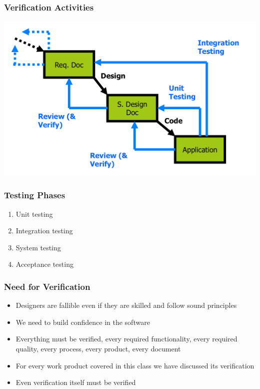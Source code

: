 \documentclass[t,12pt,numbers,fleqn]{beamer}
\begin{document}
\begin{frame}
\frametitle{Verification Activities}

\begin{center}
\includegraphics[scale=0.55]{../Figures/SoftwareLifecycle.png}
\end{center}

\end{frame}


\begin{frame}
\frametitle{Testing Phases}
\begin{enumerate}
\item Unit testing
\item Integration testing
\item System testing
\item Acceptance testing
\end{enumerate}
\end{frame}


\begin{frame}
\frametitle{Need for Verification}

\begin{itemize}

\item Designers are fallible even if they are skilled and follow sound principles
\item We need to build confidence in the software
\item Everything must be verified, every required functionality, every required
  quality, every process, every product, every document
\item For every work product covered in this class we have discussed its verification
\item Even verification itself must be verified

\end{itemize}

\end{frame}
\end{document}
